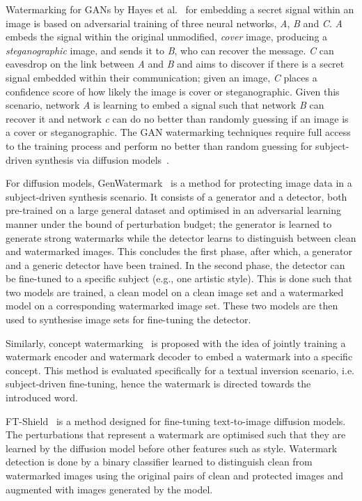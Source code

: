\documentclass[conference,table]{IEEEtran}
\begin{document}
Watermarking for GANs by Hayes et al.~\cite{hayes_generating_2017} for embedding a secret signal within an image is based on adversarial training of three neural networks, \textit{A}, \textit{B} and \textit{C}. 
\textit{A} embeds the signal within the original unmodified, \textit{cover} image, producing a \textit{steganographic} image, and sends it to \textit{B}, who can recover the message. \textit{C} can eavesdrop on the link between \textit{A} and \textit{B} and aims to discover if there is a secret signal embedded within their communication; given an image, \textit{C} places a confidence score of how likely the image is cover or steganographic. 
Given this scenario, network \textit{A} is learning to embed a signal such that network \textit{B} can recover it and network \textit{c} can do no better than randomly guessing if an image is a cover or steganographic. 
The GAN watermarking techniques require full access to the training process and perform no better than random guessing for subject-driven synthesis via diffusion models~\cite{ma_generative_2023}. 

For diffusion models, GenWatermark~\cite{ma_generative_2023} is a method for protecting image data in a subject-driven synthesis scenario. 
It consists of a generator and a detector, both pre-trained on a large general dataset and optimised in an adversarial learning manner under the bound of perturbation budget; the generator is learned to generate strong watermarks while the detector learns to distinguish between clean and watermarked images. 
This concludes the first phase, after which, a generator and a generic detector have been trained. 
In the second phase, the detector can be fine-tuned to a specific subject (e.g., one artistic style). 
This is done such that two models are trained, a clean model on a clean image set and a watermarked model on a corresponding watermarked image set. 
These two models are then used to synthesise image sets for fine-tuning the detector.

Similarly, concept watermarking~\cite{feng_catch_2023} is proposed with the idea of jointly training a watermark encoder and watermark decoder to embed a watermark into a specific concept. 
This method is evaluated specifically for a textual inversion scenario, i.e. subject-driven fine-tuning, hence the watermark is directed towards the introduced word.   

FT-Shield~\cite{cui_ft-shield_2023} is a method designed for fine-tuning text-to-image diffusion models. 
The perturbations that represent a watermark are optimised such that they are learned by the diffusion model before other features such as style.
Watermark detection is done by a binary classifier learned to distinguish clean from watermarked images using the original pairs of clean and protected images and augmented with images generated by the model. 
\end{document}
